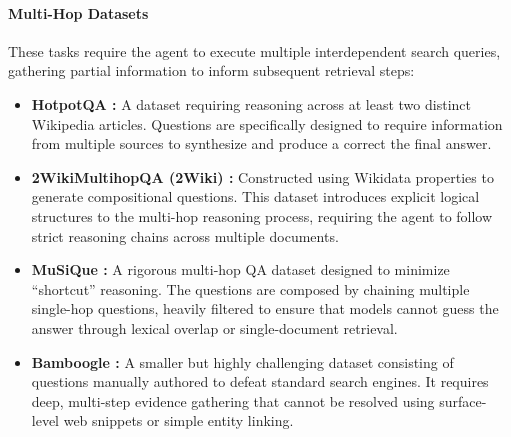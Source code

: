 \documentclass{llmxive}
\begin{document}
\paragraph{Multi-Hop Datasets} These tasks require the agent to execute multiple interdependent search queries, gathering partial information to inform subsequent retrieval steps:
\begin{itemize}[leftmargin=1.2em]
    \item \textbf{HotpotQA \citep{hotpotqa}:} A dataset requiring reasoning across at least two distinct Wikipedia articles. Questions are specifically designed to require information from multiple sources to synthesize and produce a correct the final answer.
    \item \textbf{2WikiMultihopQA (2Wiki) \citep{2wiki}:} Constructed using Wikidata properties to generate compositional questions. This dataset introduces explicit logical structures to the multi-hop reasoning process, requiring the agent to follow strict reasoning chains across multiple documents.
    \item \textbf{MuSiQue \citep{musique}:} A rigorous multi-hop QA dataset designed to minimize ``shortcut'' reasoning. The questions are composed by chaining multiple single-hop questions, heavily filtered to ensure that models cannot guess the answer through lexical overlap or single-document retrieval.
    \item \textbf{Bamboogle \citep{bamboogle}:} A smaller but highly challenging dataset consisting of questions manually authored to defeat standard search engines. It requires deep, multi-step evidence gathering that cannot be resolved using surface-level web snippets or simple entity linking.
\end{itemize}
\end{document}
